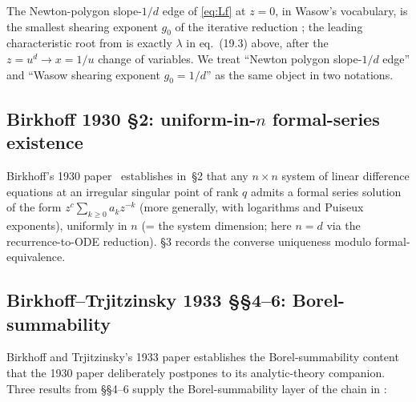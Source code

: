 \documentclass[11pt,reqno]{amsart}
\theoremstyle{plain}
\theoremstyle{definition}
\theoremstyle{remark}
\begin{document}
The Newton-polygon slope-$1/d$ edge of \eqref{eq:Lf} at
$z = 0$, in Wasow's vocabulary, is the smallest shearing
exponent $g_0$ of the iterative reduction
\cite[\S19.3]{wasow1965asymptotic}; the leading characteristic
root from  is exactly $\lambda$
in eq.~(19.3) above, after the $z = u^d \to x = 1/u$ change
of variables. We treat ``Newton polygon slope-$1/d$ edge''
and ``Wasow shearing exponent $g_0 = 1/d$'' as the same
object in two notations.

\subsection{Birkhoff 1930 \texorpdfstring{\S2}{S2}: uniform-in-$n$ formal-series existence}
\label{ssec:birkhoff}

Birkhoff's 1930 paper~\cite{birkhoff1930formal} establishes
in~\S2 that any $n \times n$ system of linear difference
equations at an irregular singular point of rank $q$ admits
a formal series solution of the form
$z^c \sum_{k\ge 0} a_k z^{-k}$ (more generally, with
logarithms and Puiseux exponents), uniformly in $n$
(= the system dimension; here $n = d$ via the
recurrence-to-ODE reduction). \S3 records the converse
uniqueness modulo formal-equivalence.

\subsection{Birkhoff--Trjitzinsky 1933 \texorpdfstring{\S\S4--6}{SS4-6}: Borel-summability}
\label{ssec:bt1933}

Birkhoff and Trjitzinsky's 1933 paper
\cite{birkhoff_trjitzinsky_1933} establishes the
Borel-summability content that the 1930 paper deliberately
postpones to its analytic-theory companion. Three results
from \S\S4--6 supply the Borel-summability layer of the
chain in :
\end{document}
